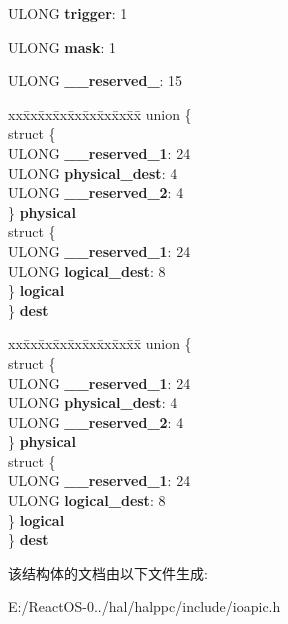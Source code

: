\begin{DoxyCompactItemize}
U\+L\+O\+NG {\bfseries trigger}\+: 1
\item 
\mbox{\label{struct___i_o_a_p_i_c___r_o_u_t_e___e_n_t_r_y_a34d44096d055efefd2a796b7f05895ba}} 
U\+L\+O\+NG {\bfseries mask}\+: 1
\item 
\mbox{\label{struct___i_o_a_p_i_c___r_o_u_t_e___e_n_t_r_y_af645dd2629864e8427a32e2e75c7eb5b}} 
U\+L\+O\+NG {\bfseries \+\_\+\+\_\+reserved\+\_}\+: 15
\item 
\mbox{\label{struct___i_o_a_p_i_c___r_o_u_t_e___e_n_t_r_y_aaf1c1a23ff853b08c02ea471c3191418}} 
\begin{tabbing}
xx\=xx\=xx\=xx\=xx\=xx\=xx\=xx\=xx\=\kill
union \{\\
\>struct \{\\
\>\>ULONG {\bfseries \_\_reserved\_1}: 24\\
\>\>ULONG {\bfseries physical\_dest}: 4\\
\>\>ULONG {\bfseries \_\_reserved\_2}: 4\\
\>\} {\bfseries physical}\\
\>struct \{\\
\>\>ULONG {\bfseries \_\_reserved\_1}: 24\\
\>\>ULONG {\bfseries logical\_dest}: 8\\
\>\} {\bfseries logical}\\
\} {\bfseries dest}\\

\end{tabbing}\item 
\mbox{\label{struct___i_o_a_p_i_c___r_o_u_t_e___e_n_t_r_y_a8d0820ab8b91488c3aebcc1d7f82d25d}} 
\begin{tabbing}
xx\=xx\=xx\=xx\=xx\=xx\=xx\=xx\=xx\=\kill
union \{\\
\>struct \{\\
\>\>ULONG {\bfseries \_\_reserved\_1}: 24\\
\>\>ULONG {\bfseries physical\_dest}: 4\\
\>\>ULONG {\bfseries \_\_reserved\_2}: 4\\
\>\} {\bfseries physical}\\
\>struct \{\\
\>\>ULONG {\bfseries \_\_reserved\_1}: 24\\
\>\>ULONG {\bfseries logical\_dest}: 8\\
\>\} {\bfseries logical}\\
\} {\bfseries dest}\\

\end{tabbing}\end{DoxyCompactItemize}


该结构体的文档由以下文件生成\+:\begin{DoxyCompactItemize}
\item 
E\+:/\+React\+O\+S-\/0../hal/halppc/include/ioapic.\+h\end{DoxyCompactItemize}
